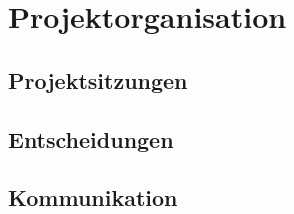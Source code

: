 \chapter{Projektorganisation}

\section{Projektsitzungen}
\section{Entscheidungen}
\section{Kommunikation}




